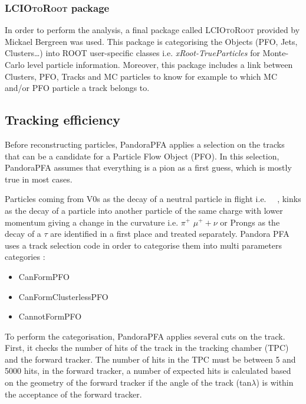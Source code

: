 \subsubsection{\textsc{LCIOtoRoot}\xspace package}

In order to perform the analysis, a final package called \textsc{LCIOtoRoot}\xspace provided by Mickael Bergreen was used. This package is categorising the \lcio Objects (PFO, Jets, Clusters\ldots) into \textsc{ROOT}\xspace user-specific classes i.e. \textit{xRoot-TrueParticles} for Monte-Carlo level particle information. Moreover, this package includes a link between Clusters, PFO, Tracks and MC particles to know for example to which MC and/or PFO particle a track belongs to.

\subsection{Tracking efficiency}

Before reconstructing particles, PandoraPFA applies a selection on the tracks that can be a candidate for a Particle Flow Object (PFO). In this selection,
PandoraPFA assumes that everything is a pion as a first guess, which is mostly true in most cases. %

Particles coming from V0s as the decay of a neutral particle in flight i.e. \gam\ \ra\ \ee, kinks as the decay of a particle into another particle of the same charge with lower momentum giving a change in the curvature i.e. $\pi^+$ \ra $\mu^++\nu$ or Prongs as the decay of a $\tau$ are identified in a first place and treated separately.
Pandora PFA uses a track selection code in order to categorise them into multi parameters categories :

\begin{itemize}
  \item CanFormPFO
  \item CanFormClusterlessPFO
  \item CannotFormPFO
\end{itemize}

To perform the categorisation, PandoraPFA applies several cuts on the track. First, it checks the number of hits of the track in the tracking chamber (TPC) and the forward tracker. The number of hits in the TPC must be between 5 and 5000 hits, in the forward tracker, a number of expected hits is calculated based on the geometry of the forward tracker if the angle of the track (tan$\lambda$) is within the acceptance of the forward tracker.

